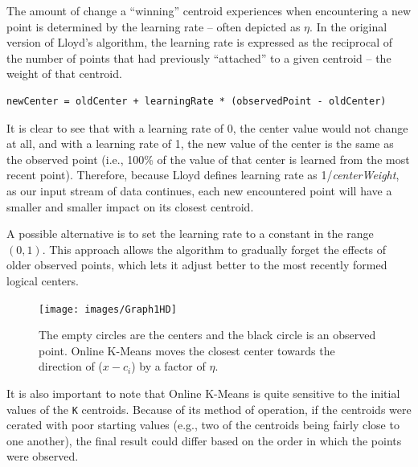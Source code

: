 \documentclass{l4proj}
\begin{document}
The amount of change a ``winning'' centroid experiences when encountering a new point is determined by the learning rate -- often depicted as $\eta$. In the original version of Lloyd's algorithm, the learning rate is expressed as the reciprocal of the number of points that had previously ``attached'' to a given centroid -- the weight of that centroid. 

\begin{center}
\begin{BVerbatim}
newCenter = oldCenter + learningRate * (observedPoint - oldCenter)
\end{BVerbatim}
\end{center}

It is clear to see that with a learning rate of 0, the center value would not change at all, and with a learning rate of 1, the new value of the center is the same as the observed point (i.e., 100\% of the value of that center is learned from the most recent point). Therefore, because Lloyd defines learning rate as 1/\textit{centerWeight}, as our input stream of data continues, each new encountered point will have a smaller and smaller impact on its closest centroid.

A possible alternative is to set the learning rate to a constant in the range $(0,1)$. This approach allows the algorithm to gradually forget the effects of older observed points, which lets it adjust better to the most recently formed logical centers.

\begin{figure}[H]
	\centering
    \label{onlineGraph}
    \texttt{[image: images/Graph1HD]}
    \caption{The empty circles are the centers and the black circle is an observed point. Online K-Means moves the closest center towards the direction of ($x-c_i$) by a factor of $\eta$.} 
\end{figure}

It is also important to note that Online K-Means is quite sensitive to the initial values of the \texttt{K} centroids. Because of its method of operation, if the centroids were cerated with poor starting values (e.g., two of the centroids being fairly close to one another), the final result could differ based on the order in which the points were observed.
\end{document}
